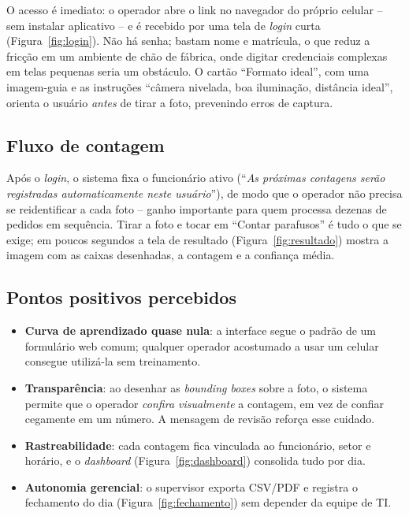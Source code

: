 \documentclass[12pt,a4paper]{article}
\begin{document}
O acesso \'e imediato: o operador abre o link no navegador do pr\'oprio celular -- sem
instalar aplicativo -- e \'e recebido por uma tela de \emph{login} curta
(Figura~\ref{fig:login}). N\~ao h\'a senha; bastam nome e matr\'icula, o que reduz a
fric\c{c}\~ao em um ambiente de ch\~ao de f\'abrica, onde digitar credenciais complexas em
telas pequenas seria um obst\'aculo. O cart\~ao ``Formato ideal'', com uma imagem-guia e as
instru\c{c}\~oes ``c\^amera nivelada, boa ilumina\c{c}\~ao, dist\^ancia ideal'', orienta o
usu\'ario \emph{antes} de tirar a foto, prevenindo erros de captura.

\subsection{Fluxo de contagem}

Ap\'os o \emph{login}, o sistema fixa o funcion\'ario ativo (``\emph{As pr\'oximas contagens
ser\~ao registradas automaticamente neste usu\'ario}''), de modo que o operador n\~ao
precisa se reidentificar a cada foto -- ganho importante para quem processa dezenas de
pedidos em sequ\^encia. Tirar a foto e tocar em ``Contar parafusos'' \'e tudo o que se
exige; em poucos segundos a tela de resultado (Figura~\ref{fig:resultado}) mostra a imagem
com as caixas desenhadas, a contagem e a confian\c{c}a m\'edia.

\subsection{Pontos positivos percebidos}

\begin{itemize}[leftmargin=*]
  \item \textbf{Curva de aprendizado quase nula}: a interface segue o padr\~ao de um
        formul\'ario web comum; qualquer operador acostumado a usar um celular consegue
        utiliz\'a-la sem treinamento.
  \item \textbf{Transpar\^encia}: ao desenhar as \emph{bounding boxes} sobre a foto, o
        sistema permite que o operador \emph{confira visualmente} a contagem, em vez de
        confiar cegamente em um n\'umero. A mensagem de revis\~ao refor\c{c}a esse cuidado.
  \item \textbf{Rastreabilidade}: cada contagem fica vinculada ao funcion\'ario, setor e
        hor\'ario, e o \emph{dashboard} (Figura~\ref{fig:dashboard}) consolida tudo por dia.
  \item \textbf{Autonomia gerencial}: o supervisor exporta CSV/PDF e registra o fechamento
        do dia (Figura~\ref{fig:fechamento}) sem depender da equipe de TI.
\end{itemize}
\end{document}
